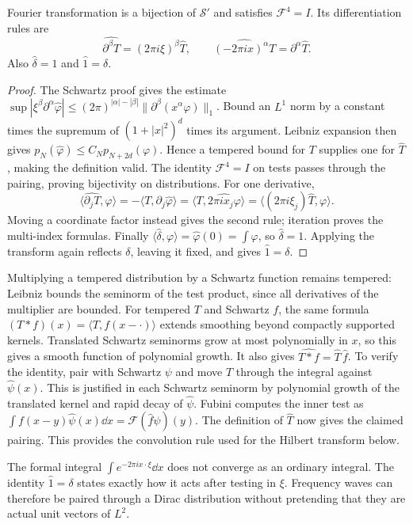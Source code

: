 \begin{theorem}\label{thm:ftsprime}
Fourier transformation is a bijection of $\mathcal S'$ and satisfies $\mathcal F^4=I$. Its differentiation rules are
\[
\widehat{\partial^\beta T}=(2\pi i\xi)^\beta\hat T,\qquad
\widehat{(-2\pi ix)^\alpha T}=\partial^\alpha\hat T.
\]
Also $\hat\delta=1$ and $\hat1=\delta$.
\end{theorem}
\begin{proof}
The Schwartz proof gives the estimate
$\sup|\xi^\beta\partial^\alpha\hat\varphi|\le(2\pi)^{|\alpha|-|\beta|}\|\partial^\beta(x^\alpha\varphi)\|_1$.
Bound an $L^1$ norm by a constant times the supremum of $(1+|x|^2)^d$ times its argument. Leibniz expansion then gives $p_N(\hat\varphi)\le C_Np_{N+2d}(\varphi)$. Hence a tempered bound for $T$ supplies one for $\hat T$, making the definition valid. The identity $\mathcal F^4=I$ on tests passes through the pairing, proving bijectivity on distributions.
For one derivative,
\[
\langle\widehat{\partial_jT},\varphi\rangle
=-\langle T,\partial_j\hat\varphi\rangle
=\langle T,\widehat{2\pi ix_j\varphi}\rangle
=\langle(2\pi i\xi_j)\hat T,\varphi\rangle.
\]
Moving a coordinate factor instead gives the second rule; iteration proves the multi-index formulas. Finally $\langle\hat\delta,\varphi\rangle=\hat\varphi(0)=\int\varphi$, so $\hat\delta=1$. Applying the transform again reflects $\delta$, leaving it fixed, and gives $\hat1=\delta$.
\end{proof}

Multiplying a tempered distribution by a Schwartz function remains tempered: Leibniz bounds the seminorm of the test product, since all derivatives of the multiplier are bounded. For tempered $T$ and Schwartz $f$, the same formula $(T*f)(x)=\langle T,f(x-\cdot)\rangle$ extends smoothing beyond compactly supported kernels. Translated Schwartz seminorms grow at most polynomially in $x$, so this gives a smooth function of polynomial growth. It also gives
$\widehat{T*f}=\hat T\,\hat f$.
To verify the identity, pair with Schwartz $\psi$ and move $T$ through the integral against $\hat\psi(x)$. This is justified in each Schwartz seminorm by polynomial growth of the translated kernel and rapid decay of $\hat\psi$. Fubini computes the inner test as
$\int f(x-y)\hat\psi(x)\dd x=\mathcal F(\hat f\psi)(y)$.
The definition of $\hat T$ now gives the claimed pairing. This provides the convolution rule used for the Hilbert transform below.

\begin{beauty}
The formal integral $\int e^{-2\pi ix\cdot\xi}\dd x$ does not converge as an ordinary integral. The identity $\hat1=\delta$ states exactly how it acts after testing in $\xi$. Frequency waves can therefore be paired through a Dirac distribution without pretending that they are actual unit vectors of $L^2$.
\end{beauty}

